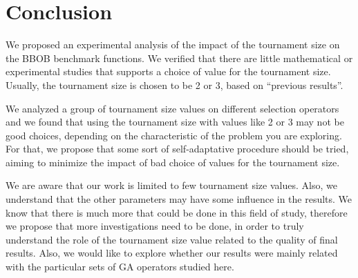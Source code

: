 \section{Conclusion}
\label{sec:conclusion}


We proposed an experimental analysis of the impact of the tournament size on the BBOB benchmark functions. We verified that there are little mathematical or experimental studies that supports a choice of value for the tournament size. Usually, the tournament size is chosen to be 2 or 3, based on ``previous results''.
 
 
We analyzed a group of tournament size values on different selection operators and we found that using the tournament size with values like 2 or 3 may not be good choices, depending on the characteristic of the problem you are exploring. For that, we propose that some sort of self-adaptative procedure should be tried, aiming to minimize the impact of bad choice of values for the tournament size.

We are aware that our work is limited to few tournament size values. Also, we understand that the other parameters may have some influence in the results. We know that there is much more that could be done in this field of study, therefore we propose that more investigations need to be done, in order to truly understand the role of the tournament size value related to the quality of final results. Also, we would like to explore whether our results were mainly related with the particular sets of GA operators studied here.